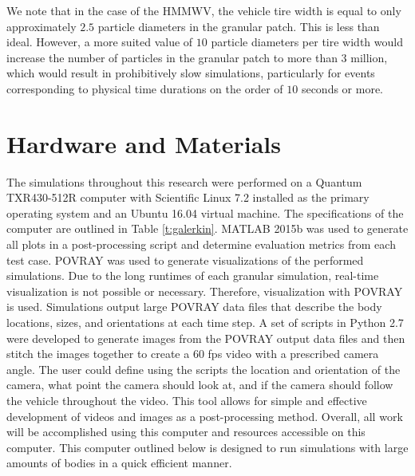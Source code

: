 \documentclass[12pt,onecolumn]{report}
\begin{document}
We note that in the case of the HMMWV, the vehicle tire width is equal to only approximately $2.5$ particle diameters in the granular patch.  This is less than ideal.  However, a more suited value of $10$ particle diameters per tire width would increase the number of particles in the granular patch to more than $3$ million, which would result in prohibitively slow simulations, particularly for events corresponding to physical time durations on the order of $10$ seconds or more.

\section{Hardware and Materials}\label{s:Hardware}

The simulations throughout this research were performed on a Quantum TXR430-512R computer with Scientific Linux 7.2 installed as the primary operating system and an Ubuntu 16.04 virtual machine. The specifications of the computer are outlined in Table \ref{t:galerkin}. MATLAB 2015b was used to generate all plots in a post-processing script and determine evaluation metrics from each test case. POVRAY was used to generate visualizations of the performed simulations. Due to the long runtimes of each granular simulation, real-time visualization is not possible or necessary. Therefore, visualization with POVRAY is used. Simulations output large POVRAY data files that describe the body locations, sizes, and orientations at each time step. A set of scripts in Python 2.7 were developed to generate images from the POVRAY output data files and then stitch the images together to create a 60 fps video with a prescribed camera angle. The user could define using the scripts the location and orientation of the camera, what point the camera should look at, and if the camera should follow the vehicle throughout the video. This tool allows for simple and effective development of videos and images as a post-processing method. Overall, all work will be accomplished using this computer and resources accessible on this computer. This computer outlined below is designed to run simulations with large amounts of bodies in a quick efficient manner.
\end{document}
